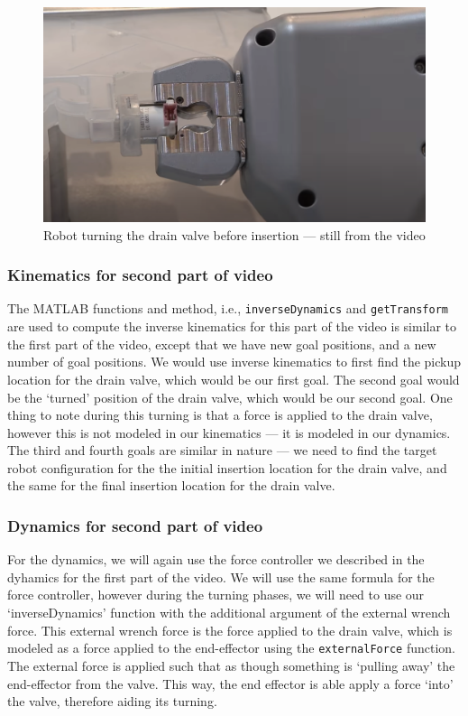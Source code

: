 \documentclass[conference]{IEEEtran}
\begin{document}
\begin{figure}[h!]
    \centering
    \includegraphics[scale=0.2]{kuka-valve-insertion.png}
    \caption{Robot turning the drain valve before insertion --- still from the video}
    \label{kuka-drain-valve-insertion}
\end{figure}

\subsubsection{Kinematics for second part of video}

The MATLAB functions and method, i.e., \texttt{inverseDynamics} and \texttt{getTransform} are used to compute the inverse kinematics for this part of the video is similar to the first part of the
video, except that we have new goal positions, and a new number of goal positions. We would
use inverse kinematics to first find the pickup location for the drain valve, which would be our
first goal. The second goal would be the `turned' position of the drain valve, which would be
our second goal. One thing to note during this turning is that a force is applied to the drain
valve, however this is not modeled in our kinematics --- it is modeled in our dynamics.
The third and fourth goals are similar in nature --- we need to find the target robot configuration for the the initial insertion location
for the drain valve, and the same for the final insertion location for the drain valve.

\subsubsection{Dynamics for second part of video}
For the dynamics, we will again use the force controller we described in the dyhamics for the first part
of the video. We will use the same formula for the force controller, however during the turning phases, we will need to use
our `inverseDynamics' function with the additional argument of the external wrench force. This external
wrench force is the force applied to the drain valve, which is modeled as a force applied to the end-effector
using the \texttt{externalForce} function. The external force is applied such that as though something
is `pulling away' the end-effector from the valve. This way, the end effector is able apply a force `into'
the valve, therefore aiding its turning.
\end{document}
